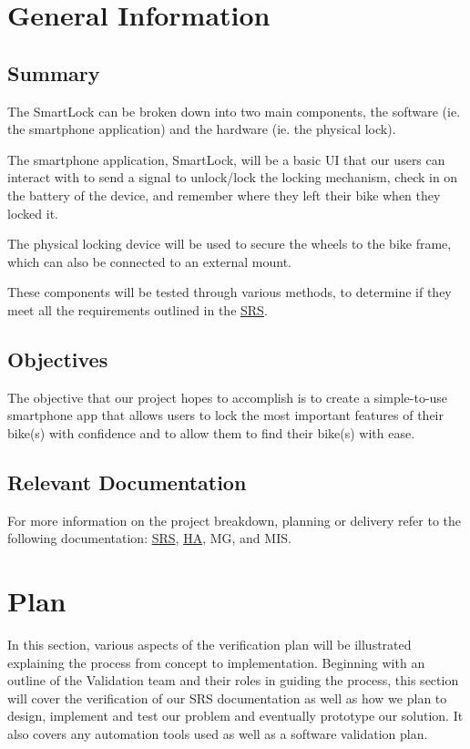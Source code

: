 \documentclass[12pt, titlepage]{article}
\begin{document}
\section{General Information}

\subsection{Summary}

The SmartLock can be broken down into two main components, the software (ie. the smartphone application) and the hardware (ie. the physical lock).

The smartphone application, SmartLock, will be a basic UI that our users can interact with to send a signal to unlock/lock the locking mechanism, check in on the battery of the device, and remember where they left their bike when they locked it.

The physical locking device will be used to secure the wheels to the bike frame, which can also be connected to an external mount.

These components will be tested through various methods, to determine if they meet all the requirements outlined in the \href{https://github.com/NevoAbigail/Capstone/blob/main/docs/SRS/SRS.pdf}{SRS}.

\subsection{Objectives}
The objective that our project hopes to accomplish is to create a simple-to-use smartphone app that allows users to lock the most important features of their bike(s) with confidence and to allow them to find their bike(s) with ease.

\subsection{Relevant Documentation}

For more information on the project breakdown, planning or delivery refer to the following documentation:
 \href{https://github.com/NevoAbigail/Capstone/blob/main/docs/SRS/SRS.pdf}{SRS},
 \href{https://github.com/NevoAbigail/Capstone/blob/main/docs/HazardAnalysis/HazardAnalysis.pdf}{HA}, MG, and MIS.
 

\section{Plan}

In this section, various aspects of the verification plan will be illustrated explaining the process from concept to implementation. Beginning with an outline of the Validation team and their roles in guiding the process, this section will cover the verification of our SRS documentation as well as how we plan to design, implement and test our problem and eventually prototype our solution. It also covers any automation tools used as well as a software validation plan.
\end{document}
